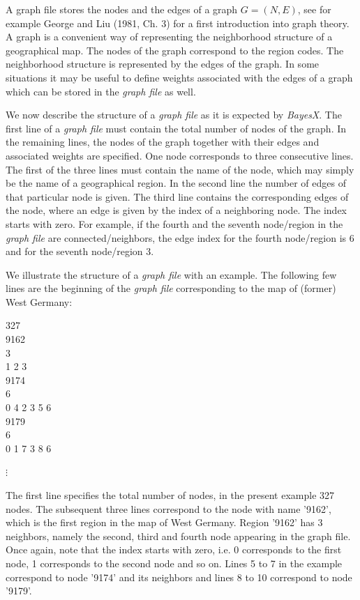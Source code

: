 A graph file stores the nodes and the edges of a graph $G =
(N,E)$, see for example George and Liu (1981, Ch. 3) for a first
introduction into graph theory. A graph is a convenient way of
representing the neighborhood structure of a geographical map. The
nodes of the graph correspond to the region codes. The
neighborhood structure is represented by the edges of the graph.
In some situations it may be useful to define weights associated
with the edges of a graph which can be stored in the {\em graph
file} as well.

We now describe the structure of a {\em graph file} as it is expected by
{\em BayesX}. The first line of a {\em graph file} must contain
the total number of nodes of the graph. In the remaining lines,
the nodes of the graph together with their edges and associated
weights are specified. One node corresponds to three consecutive
lines. The first of the three lines must contain the name of the
node, which may simply be the name of a geographical region. In
the second line the number of edges of that particular node is
given. The third line contains the corresponding edges of the
node, where an edge is given by the index of a neighboring node.
The index starts with zero. For example, if the fourth and the
seventh node/region in the {\em graph file} are
connected/neighbors, the edge index for the fourth node/region is
6 and for the seventh node/region 3.

We illustrate the structure of a {\em graph file} with an example. The
following few lines are the beginning
of the {\em graph file} corresponding to the map of (former) West Germany:

\footnotesize

327 \\
9162 \\
3 \\
1 2 3 \\
9174 \\
6 \\
0 4 2 3 5 6 \\
9179 \\
6 \\
0 1 7 3 8 6

\hspace{1cm} $\vdots$

\normalsize

\vspace{0.5cm}

The first line specifies the total number of nodes, in the present
example 327 nodes. The subsequent three lines correspond to the
node with name '9162', which is the first region in the map of
West Germany. Region '9162' has 3 neighbors, namely the second,
third and fourth node appearing in the graph file. Once again,
note that the index starts with zero, i.e. 0 corresponds to the
first node, 1 corresponds to the second node and so on. Lines 5 to
7 in the example correspond to node '9174' and its neighbors and
lines 8 to 10 correspond to node '9179'.

